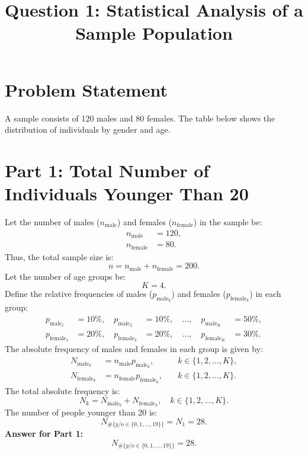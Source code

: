 \documentclass[12pt]{article}
\title{Question 1: Statistical Analysis of a Sample Population}
\author{}
\date{}
\begin{document}
	\maketitle
	\onehalfspacing
	
	\section*{Problem Statement}
	A sample consists of 120 males and 80 females. The table below shows the distribution of individuals by gender and age.
	
	\bigskip
	
	\section*{Part 1: Total Number of Individuals Younger Than 20}
	Let the number of males ($n_{\mathrm{male}}$) and females ($n_{\mathrm{female}}$) in the sample be:
	\[
	\begin{aligned}
		n_{\mathrm{male}} &= 120, \\
		n_{\mathrm{female}} &= 80.
	\end{aligned}
	\]
	Thus, the total sample size is:
	\[
	n = n_{\mathrm{male}} + n_{\mathrm{female}} = 200.
	\]
	Let the number of age groups be:
	\[
	K = 4.
	\]
	Define the relative frequencies of males ($p_{\mathrm{male}_k}$) and females ($p_{\mathrm{female}_k}$) in each group:
	\[
	\begin{alignedat}{4}
		p_{\mathrm{male}_1} &= 10\%,\quad p_{\mathrm{male}_2} &= 10\%,\quad \dots,\quad p_{\mathrm{male}_K} &= 50\%, \\
		p_{\mathrm{female}_1} &= 20\%,\quad p_{\mathrm{female}_2} &= 20\%,\quad \dots,\quad p_{\mathrm{female}_K} &= 30\%.
	\end{alignedat}
	\]
	The absolute frequency of males and females in each group is given by:
	\[
	\begin{alignedat}{2}
		N_{\mathrm{male}_k} &= n_{\mathrm{male}} p_{\mathrm{male}_k},\quad &k \in \{1,2,\dots,K\}, \\
		N_{\mathrm{female}_k} &= n_{\mathrm{female}} p_{\mathrm{female}_k},\quad &k \in \{1,2,\dots,K\}.
	\end{alignedat}
	\]
	The total absolute frequency is:
	\[
	N_k = N_{\mathrm{male}_k} + N_{\mathrm{female}_k},\quad k \in \{1,2,\dots,K\}.
	\]
	The number of people younger than 20 is:
	\[
	N_{\#\{y/o \in \{0,1,\dots,19\}\}} = N_1 = 28.
	\]
	\textbf{Answer for Part 1:}
	\[
	\boxed{N_{\#\{y/o \in \{0,1,\dots,19\}\}} = 28}.
	\]
	
\end{document}
